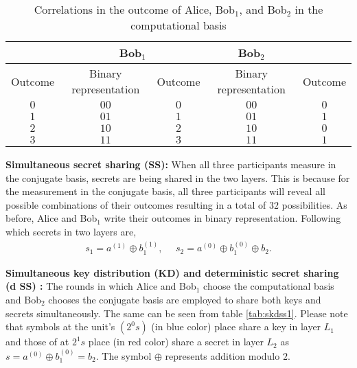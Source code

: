 \documentclass[fleqn,10pt]{wlscirep}
\begin{document}
\begin{table}[h!]
    \centering
    \begin{tabular}{|c|c|c|c|c|}
    \hline
    \rowcolor{lightgray}    \multicolumn{2}{|c}{Alice} &\multicolumn{2}{|c|}{Bob$_1$} &   Bob$_2$ \\\hline
    \rowcolor{lightgray}   Outcome&Binary representation& Outcome& Binary representation   & Outcome \\\hline
     $0$ & {\color{blue}$0$}{\color{red}$0$} & $0$ & {\color{blue}$0$}{\color{red}$0$}  & {\color{red}$0$}\\
    \rowcolor{lightgray}   $1$ &{\color{blue} $0$}{\color{red}$1$} & $1$ & {\color{blue}$0$}{\color{red}$1$} & {\color{red}$1$}\\
       $2$ &{\color{blue} $1$}{\color{red}$0$} & $2$ & {\color{blue}$1$}{\color{red}$0$} & {\color{red}$0$}\\
    \rowcolor{lightgray}   $3$ & {\color{blue}$1$}{\color{red}$1$} & $3$ & {\color{blue}$1$}{\color{red}$1$} & {\color{red}$1$}\\\hline
    \end{tabular}
    \caption{Correlations in the outcome of Alice, Bob$_1$, and Bob$_2$ in the computational basis}
    \label{tab:skd}
\end{table}



\noindent\textbf{Simultaneous secret sharing (SS):} When all three participants measure in the conjugate basis, secrets are being shared in the two layers. This is because for the measurement in the conjugate basis, all three participants will reveal all possible combinations of their outcomes resulting in a total of $32$ possibilities. As before, Alice and Bob$_1$ write their outcomes in binary representation. Following which secrets in two layers are,
\begin{align}
    s_1=a^{(1)}\oplus b_1^{(1)},~~~~~~s_2=a^{(0)}\oplus b_1^{(0)}\oplus b_2.
\end{align}


\noindent\textbf{Simultaneous key distribution (KD) and deterministic secret sharing (d SS) :} The rounds in which Alice and Bob$_1$ choose the computational basis and Bob$_2$ chooses the conjugate basis are employed to share both keys and secrets simultaneously. The same can be seen from table \ref{tab:skdss1}. Please note that symbols at the unit's $(2^0 s)$ (in blue color) place share a key in layer $L_1$ and those of at $2^1 s$ place (in red color) share a secret in layer $L_2$ as $s=a^{(0)}\oplus b_1^{(0)}=b_2$. The symbol $\oplus$ represents addition modulo $2$.
\end{document}
